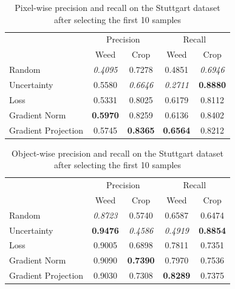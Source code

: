 \documentclass[letterpaper, 10 pt, conference]{ieeeconf}  %
\begin{document}
       \begin{table}
        \centering
        \caption{Pixel-wise precision and recall on the Stuttgart dataset after selecting the first 10 samples}
        \begin{tabular}{@{}lcccc@{}} 
            \toprule
            & \multicolumn{2}{c}{Precision} & \multicolumn{2}{c}{Recall}\\ 
           \cmidrule{2-5} 
               & Weed & Crop & Weed & Crop \\ 
            \midrule 
    		  Random & \textit{0.4095} & 0.7278 & 0.4851 & \textit{0.6946}  \\ \addlinespace
    		  Uncertainty & 0.5580 & \textit{0.6646} & \textit{0.2711} & \textbf{0.8880}  \\ \addlinespace
    		  Loss & 0.5331 & 0.8025 & 0.6179 & 0.8112  \\ \addlinespace
    		  Gradient Norm & \textbf{0.5970} & 0.8259 & 0.6136 & 0.8402  \\ \addlinespace
    		  Gradient Projection & 0.5745 & \textbf{0.8365} & \textbf{0.6564} & 0.8212  \\ 
            \bottomrule
        \end{tabular}
        \label{tab:pixel_wise_10_stuttgart}
    \end{table}
   
   
   
   
          \begin{table}
        \centering
        \caption{Object-wise precision and recall on the Stuttgart dataset after selecting the first 10 samples}
        \begin{tabular}{@{}lcccc@{}} 
            \toprule
            & \multicolumn{2}{c}{Precision} & \multicolumn{2}{c}{Recall}\\ 
           \cmidrule{2-5} 
               & Weed & Crop & Weed & Crop \\ 
            \midrule 
    		  Random & \textit{0.8723} & 0.5740 & 0.6587 & 0.6474  \\ \addlinespace
    		  Uncertainty & \textbf{0.9476} & \textit{0.4586} & \textit{0.4919} & \textbf{0.8854}  \\ \addlinespace
    		  Loss & 0.9005 & 0.6898 & 0.7811 & 0.7351  \\ \addlinespace
    		  Gradient Norm & 0.9090 & \textbf{0.7390} & 0.7970 & 0.7536  \\ \addlinespace
    		  Gradient Projection & 0.9030 & 0.7308 & \textbf{0.8289} & 0.7375  \\ 
            \bottomrule
        \end{tabular}
        \label{tab:object_wise_10_stuttgart}
    \end{table}
   
\end{document}
